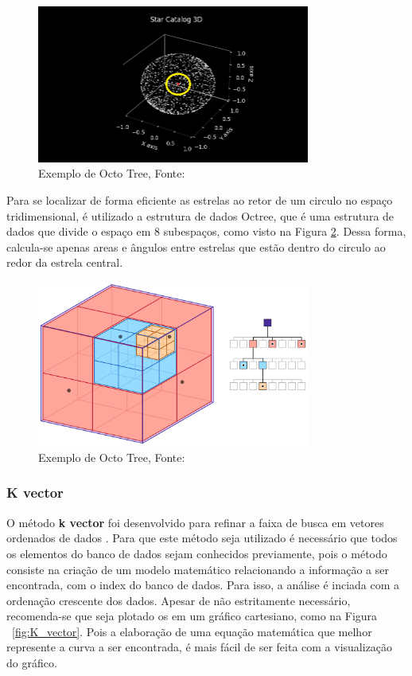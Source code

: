 \begin{figure}[H]
    \centering
    \includegraphics[width=0.8\textwidth]{images/estrelas_endorno.png}
    \caption{Exemplo de Octo Tree, Fonte: \cite{octo_tree}}
    \label{fig:estrelas_endorno}
\end{figure}

Para se localizar de forma eficiente as estrelas ao retor de um circulo no espaço tridimensional, é utilizado a estrutura de dados Octree,
que é uma estrutura de dados que divide o espaço em 8 subespaços, como visto na Figura \ref{fig:octo_tree}. 
Dessa forma, calcula-se apenas areas e ângulos entre estrelas que estão dentro do circulo ao redor da estrela central.

\begin{figure}[H]
    \centering
    \includegraphics[width=0.8\textwidth]{images/octree.png}
    \caption{Exemplo de Octo Tree, Fonte: \cite{octo_tree}}
    \label{fig:octo_tree}
\end{figure}

\subsubsection{K vector}

O método \textbf{k vector} foi desenvolvido para refinar a faixa de busca em vetores ordenados de dados \cite{Mortari}.
Para que este método seja utilizado é necessário que todos os elementos do banco de dados sejam conhecidos previamente, 
pois o método consiste na criação de um modelo matemático relacionando a informação a ser encontrada, com o index do banco de dados.
Para isso,  a análise é inciada com a ordenação crescente dos dados. 
Apesar de não estritamente necessário, recomenda-se que seja plotado os em um  gráfico cartesiano, como na Figura ~\ref{fig:K_vector}.
Pois a elaboração de uma equação matemática que melhor represente a curva a ser encontrada, é mais fácil de ser feita com a visualização do gráfico.

